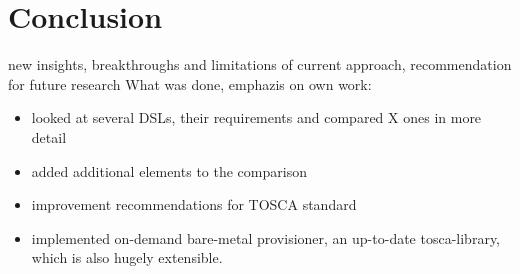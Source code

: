 \chapter{Conclusion}



new insights, breakthroughs  and limitations of current approach, recommendation for future research
\newline
What was done, emphazis on own work:

\begin{itemize}
  \item looked at several DSLs, their requirements and compared X ones in more detail
  \item added additional elements to the comparison
  \item improvement recommendations for TOSCA standard
  \item implemented on-demand bare-metal provisioner, an up-to-date tosca-library, which is also hugely extensible.
\end{itemize}
